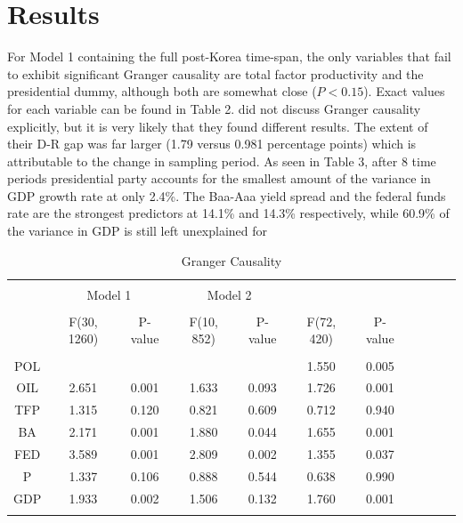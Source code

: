 \documentclass[a4paper, 12pt]{article}
\begin{document}
\section{Results}
For Model 1 containing the full post-Korea time-span, the only variables that fail to exhibit significant Granger causality are total factor productivity and the presidential dummy, although both are somewhat close ($P < 0.15$). Exact values for each variable can be found in Table 2.  did not discuss Granger causality explicitly, but it is very likely that they found different results. The extent of their D-R gap was far larger (1.79 versus 0.981 percentage points) which is attributable to the change in sampling period. As seen in Table 3, after 8 time periods presidential party accounts for the smallest amount of the variance in GDP growth rate at only 2.4\%. The Baa-Aaa yield spread and the federal funds rate are the strongest predictors at 14.1\% and 14.3\% respectively, while 60.9\% of the variance in GDP is still left unexplained for \par 

 \begin{table}[!htbp] \centering 
  \caption{Granger Causality} 
  \label{} 
\begin{tabular}{@{\extracolsep{1pt}} ccccccccccc} 
\\[-1.8ex]\hline 
\hline \\[-1.8ex]
& \multicolumn{2}{c}{Model 1} & \multicolumn{2}{c}{Model 2} \multicolumn{2}{c}{Model 3}\\
\hline \\[-1.8ex]
& F(30, 1260) & P-value & F(10, 852) & P-value & F(72, 420) & P-value\\
\hline \\[-1.8ex] 
POL & & & & & 1.550 & 0.005\\
OIL & 2.651 & 0.001 & 1.633 & 0.093 & 1.726 & 0.001\\
TFP & 1.315 & 0.120 & 0.821 & 0.609 & 0.712 & 0.940\\
BA & 2.171 & 0.001 & 1.880 & 0.044 & 1.655 & 0.001\\
FED & 3.589 & 0.001 & 2.809 & 0.002 & 1.355 & 0.037\\
P & 1.337 & 0.106 & 0.888 & 0.544 & 0.638 & 0.990\\
GDP & 1.933 & 0.002 & 1.506 & 0.132 & 1.760 & 0.001\\
\hline \\[-1.8ex] 
\end{tabular} 
\end{table}
\end{document}
